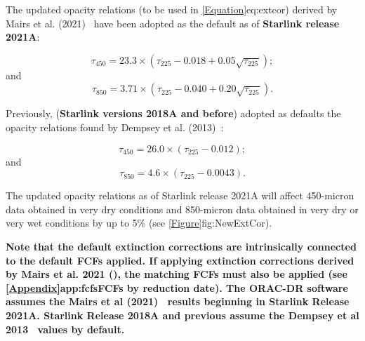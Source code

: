 The updated opacity relations (to be used in \cref{Equation}{eq:extcor}{})
derived by Mairs et al. (2021)~\cite{mairs21}
have been adopted as the default as of \textbf{Starlink release 2021A}:

\begin{equation}
\tau_{450} = 23.3 \times (\tau_{225} - 0.018 + 0.05\sqrt{\tau_{225}});
\end{equation}
and
\begin{equation}
\tau_{850} = 3.71 \times (\tau_{225} - 0.040 + 0.20\sqrt{\tau_{225}}).
\end{equation}

Previously, (\textbf{Starlink versions 2018A and before}) adopted as defaults the opacity relations
found by Dempsey et al. (2013)~\cite{dempsey12}:

\begin{equation}
\tau_{450} = 26.0 \times (\tau_{225} - 0.012);
\end{equation}
and
\begin{equation}
\tau_{850} = 4.6 \times (\tau_{225} - 0.0043).
\end{equation}

The updated opacity relations as of Starlink release 2021A  will affect
450-micron data obtained in very dry conditions and 850-micron data
obtained in very dry or very wet conditions by up to 5\% (see \cref{Figure}{fig:NewExtCor}{}).

\textbf{Note that the default extinction corrections are intrinsically connected to the default FCFs
applied. If applying extinction corrections derived by Mairs et al. 2021 (\cite{mairs21}), the matching
FCFs must also be applied (see \cref{Appendix}{app:fcfs}{FCFs by reduction date}).
The ORAC-DR software assumes the Mairs et al (2021)~\cite{mairs21}
results beginning in Starlink Release 2021A. Starlink Release 2018A and previous assume the
Dempsey et al 2013~\cite{dempsey12} values by default.}

